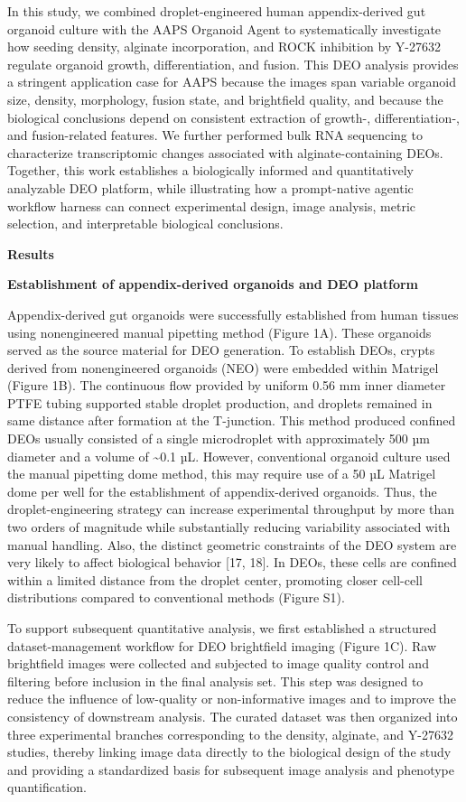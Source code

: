 \documentclass[
]{article}
\providecommand{\DIFadd}[1]{{\begingroup\color{blue}#1\endgroup}}
\begin{document}
\DIFadd{In this study, we combined droplet-engineered human appendix-derived gut organoid culture with the AAPS Organoid Agent to systematically investigate how seeding density, alginate incorporation, and ROCK inhibition by Y-27632 regulate organoid growth, differentiation, and fusion. This DEO analysis provides a stringent application case for AAPS because the images span variable organoid size, density, morphology, fusion state, and brightfield quality, and because the biological conclusions depend on consistent extraction of growth-, differentiation-, and fusion-related features. We further performed bulk RNA sequencing to characterize transcriptomic changes associated with alginate-containing DEOs. Together, this work establishes a biologically informed and quantitatively analyzable DEO platform, while illustrating how a prompt-native agentic workflow harness can connect experimental design, image analysis, metric selection, and interpretable biological conclusions.}

\textbf{Results}

\textbf{Establishment of appendix-derived organoids and DEO platform}

Appendix-derived gut organoids were successfully established from human tissues using nonengineered manual pipetting method (Figure 1A). These organoids served as the source material for DEO generation. To establish DEOs, crypts derived from nonengineered organoids (NEO) were embedded within Matrigel (Figure 1B). The continuous flow provided by uniform 0.56 mm inner diameter PTFE tubing supported stable droplet production, and droplets remained in same distance after formation at the T-junction. This method produced confined DEOs usually consisted of a single microdroplet with approximately 500 µm diameter and a volume of \textasciitilde0.1 µL. However, conventional organoid culture used the manual pipetting dome method, this may require use of a 50 µL Matrigel dome per well for the establishment of appendix-derived organoids. Thus, the droplet-engineering strategy can increase experimental throughput by more than two orders of magnitude while substantially reducing variability associated with manual handling. Also, the distinct geometric constraints of the DEO system are very likely to affect biological behavior {[}17, 18{]}. In DEOs, these cells are confined within a limited distance from the droplet center, promoting closer cell-cell distributions compared to conventional methods (Figure S1).

To support subsequent quantitative analysis, we first established a structured dataset-management workflow for DEO brightfield imaging (Figure 1C). Raw brightfield images were collected and subjected to image quality control and filtering before inclusion in the final analysis set. This step was designed to reduce the influence of low-quality or non-informative images and to improve the consistency of downstream analysis. The curated dataset was then organized into three experimental branches corresponding to the density, alginate, and Y-27632 studies, thereby linking image data directly to the biological design of the study and providing a standardized basis for subsequent image analysis and phenotype quantification.
\end{document}
